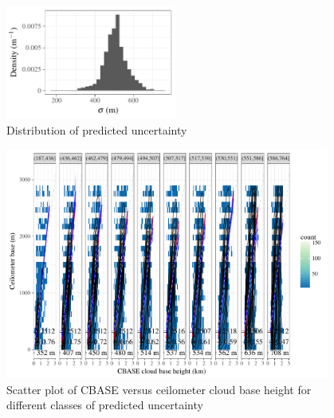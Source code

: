 \documentclass[amt,manuscript]{copernicus}\usepackage[]{graphicx}\usepackage[]{color}
\newenvironment{knitrout}{}{} %
\begin{document}
\begin{figure}
  \centering
\begin{knitrout}
\color{fgcolor}

{\centering \includegraphics[width=0.5\textwidth]{figure/method-combo-eval-rmse-1} 

}



\end{knitrout}
  \caption{Distribution of predicted uncertainty}
  \label{fig:uncertainty}
\end{figure}

\begin{figure}
  \centering
\begin{knitrout}
\color{fgcolor}

{\centering \includegraphics[width=0.95\textwidth]{figure/method-combo-plot-rmseclass-1} 

}



\end{knitrout}
  \caption{Scatter plot of CBASE versus ceilometer cloud base height for
    different classes of predicted uncertainty}
  \label{fig:rmseclass}
\end{figure}
\end{document}
